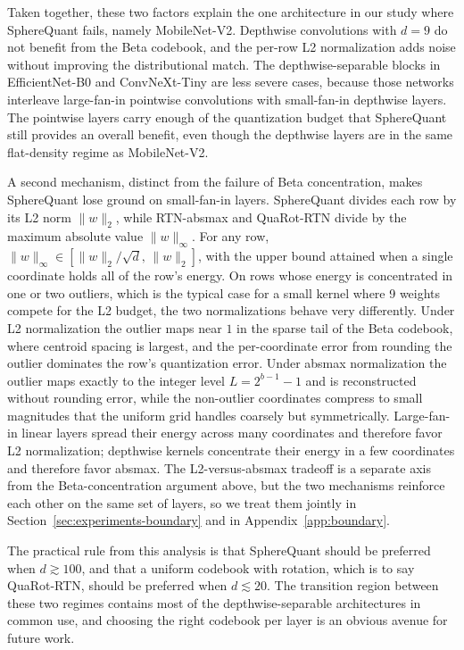 Taken together, these two factors explain the one architecture in our
study where SphereQuant fails, namely MobileNet-V2. Depthwise convolutions with
$d = 9$ do not benefit from the Beta codebook, and the per-row L2
normalization adds noise without improving the distributional match. The
depthwise-separable blocks in EfficientNet-B0 and ConvNeXt-Tiny are less
severe cases, because those networks interleave large-fan-in pointwise
convolutions with small-fan-in depthwise layers. The pointwise layers
carry enough of the quantization budget that SphereQuant still provides an overall
benefit, even though the depthwise layers are in the same flat-density
regime as MobileNet-V2.

A second mechanism, distinct from the failure of Beta concentration,
makes SphereQuant lose ground on small-fan-in layers. SphereQuant divides
each row by its L2 norm $\lVert w \rVert_2$, while RTN-absmax and
QuaRot-RTN divide by the maximum absolute value $\lVert w \rVert_\infty$.
For any row, $\lVert w \rVert_\infty \in [\lVert w \rVert_2 / \sqrt{d},\,
\lVert w \rVert_2]$, with the upper bound attained when a single
coordinate holds all of the row's energy. On rows whose energy is
concentrated in one or two outliers, which is the typical case for a
small kernel where 9 weights compete for the L2 budget, the two
normalizations behave very differently. Under L2 normalization the
outlier maps near $1$ in the sparse tail of the Beta codebook, where
centroid spacing is largest, and the per-coordinate error from rounding
the outlier dominates the row's quantization error. Under absmax
normalization the outlier maps exactly to the integer level
$L = 2^{b-1} - 1$ and is reconstructed without rounding error, while
the non-outlier coordinates compress to small magnitudes that the
uniform grid handles coarsely but symmetrically. Large-fan-in linear
layers spread their energy across many coordinates and therefore favor
L2 normalization; depthwise kernels concentrate their energy in a few
coordinates and therefore favor absmax. The L2-versus-absmax tradeoff
is a separate axis from the Beta-concentration argument above, but the
two mechanisms reinforce each other on the same set of layers, so we
treat them jointly in Section~\ref{sec:experiments-boundary} and in
Appendix~\ref{app:boundary}.

The practical rule from this analysis is that SphereQuant should be preferred when
$d \gtrsim 100$, and that a uniform codebook with rotation, which is to
say QuaRot-RTN, should be preferred when $d \lesssim 20$. The transition
region between these two regimes contains most of the depthwise-separable
architectures in common use, and choosing the right codebook per layer is
an obvious avenue for future work.

